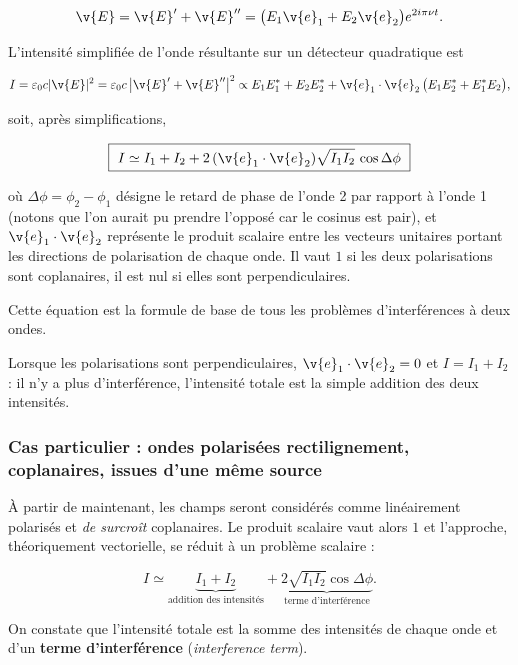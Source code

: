 \[ \v{E} = \v{E}' + \v{E}'' = \bigl(E_1 \v{e}_1 + E_2 \v{e}_2\bigr) e^{2i\pi\nu t}. \]

L'intensité simplifiée de l'onde résultante sur un détecteur quadratique est

\[ I = \varepsilon_0 c |\v{E}|^{2}
     = \varepsilon_0 c \,\bigl|\v{E}' + \v{E}''\bigr|^{2}
     \propto E_1 E_1^{*} + E_2 E_2^{*}
       + \v{e}_1 \cdot \v{e}_2 \,\bigl(E_1 E_2^{*} + E_1^{*} E_2\bigr), \]

soit, après simplifications,

\[ \boxed{\ I \simeq I_1 + I_2 + 2\,(\v{e}_1\cdot\v{e}_2)\sqrt{I_1 I_2}\,
   \cos\Delta\phi \ } \]

où $\Delta\phi = \phi_2 - \phi_1$ désigne le retard de phase de l'onde 2 par
rapport à l'onde 1 (notons que l'on aurait pu prendre l'opposé car le cosinus est
pair), et $\v{e}_1 \cdot \v{e}_2$ représente le produit scalaire entre les
vecteurs unitaires portant les directions de polarisation de chaque onde. Il vaut
$1$ si les deux polarisations sont coplanaires, il est nul si elles sont
perpendiculaires.

\begin{conclusion}
  Cette équation est la formule de base de tous les problèmes d'interférences à
  deux ondes.
\end{conclusion}

\begin{remark}
  Lorsque les polarisations sont perpendiculaires, $\v{e}_1 \cdot \v{e}_2 = 0$ et
  $I = I_1 + I_2$ : il n'y a plus d'interférence, l'intensité totale est la
  simple addition des deux intensités.
\end{remark}

\subsubsection{Cas particulier : ondes polarisées rectilignement, coplanaires, issues d'une même source}

À partir de maintenant, les champs seront considérés comme linéairement polarisés
et \emph{de surcroît} coplanaires. Le produit scalaire vaut alors $1$ et
l'approche, théoriquement vectorielle, se réduit à un problème scalaire :

\[ I \simeq \underbrace{I_1 + I_2}_{\text{addition des intensités}}
   + \underbrace{2\sqrt{I_1 I_2}\cos\Delta\phi}_{\text{terme d'interférence}} . \]

On constate que l'intensité totale est la somme des intensités de chaque onde et
d'un \textbf{terme d'interférence} (\textit{interference term}).

